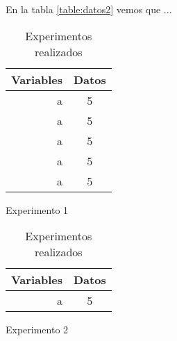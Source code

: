 \documentclass[12pt]{report}
\begin{document}
		En la tabla \ref{table:datos2} vemos que ... \lipsum[1]
		\begin{table}[h!]
			\centering
			\begin{subtable}{0.4\textwidth}
				\centering
				\begin{tabular}{| r | c |}
					\hline
					Variables  & Datos \\ \hline
					a & 5 \\ \hline
					a & 5 \\ \hline
					a & 5 \\ \hline
					a & 5 \\ \hline
					a & 5 \\ \hline
				\end{tabular}
				\caption{Experimento 1}
				\label{table:datos1}
			\end{subtable}
			\hfill
			\begin{subtable}{0.4\textwidth}
				\centering
				\begin{tabular}{| r | c |}
					\hline
					Variables  & Datos \\ \hline
					a & 5 \\ \hline
				\end{tabular}
				\caption{Experimento 2}
				\label{table:datos2}
			\end{subtable}
			\caption{Experimentos realizados}
			\label{table:datos}
		\end{table}
		\lipsum[1-3]
		
\end{document}
